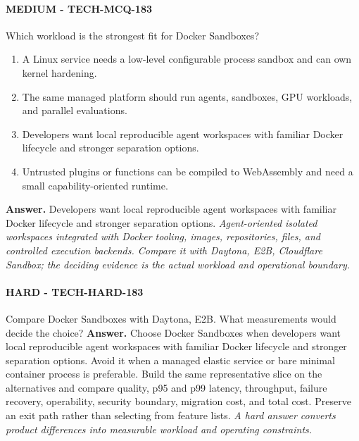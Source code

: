 \paragraph{MEDIUM - TECH-MCQ-183} Which workload is the strongest fit for Docker Sandboxes?
\begin{enumerate}[label=\Alph*.]
\item A Linux service needs a low-level configurable process sandbox and can own kernel hardening.
\item The same managed platform should run agents, sandboxes, GPU workloads, and parallel evaluations.
\item Developers want local reproducible agent workspaces with familiar Docker lifecycle and stronger separation options.
\item Untrusted plugins or functions can be compiled to WebAssembly and need a small capability-oriented runtime.
\end{enumerate}
\textbf{Answer.} Developers want local reproducible agent workspaces with familiar Docker lifecycle and stronger separation options.
\textit{Agent-oriented isolated workspaces integrated with Docker tooling, images, repositories, files, and controlled execution backends. Compare it with Daytona, E2B, Cloudflare Sandbox; the deciding evidence is the actual workload and operational boundary.}
\paragraph{HARD - TECH-HARD-183} Compare Docker Sandboxes with Daytona, E2B. What measurements would decide the choice?
\textbf{Answer.} Choose Docker Sandboxes when developers want local reproducible agent workspaces with familiar Docker lifecycle and stronger separation options. Avoid it when a managed elastic service or bare minimal container process is preferable. Build the same representative slice on the alternatives and compare quality, p95 and p99 latency, throughput, failure recovery, operability, security boundary, migration cost, and total cost. Preserve an exit path rather than selecting from feature lists.
\textit{A hard answer converts product differences into measurable workload and operating constraints.}
